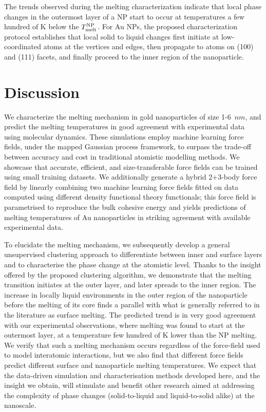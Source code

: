 \documentclass[%
aip,
 amsmath,amssymb,
 reprint,
]{revtex4-1}
\newcommand*\subt[1]{_{\textnormal{#1}}}
\newcommand*\supt[1]{^{\textnormal{#1}}}
\begin{document}
The trends observed during the melting characterization indicate that local phase changes in the outermost layer of a NP start to occur at temperatures a few hundred of K below the $T\subt{melt}\supt{NP}$.
%
For Au NPs, the proposed characterization protocol establishes that local solid to liquid changes first initiate at low-coordinated atoms at the vertices and edges, then propagate to atoms on (100) and (111) facets, and finally proceed to the inner region of the nanoparticle.
%

\section*{Discussion}
%
We characterize the melting mechanism in gold nanoparticles of size 1-6~$nm$, and predict the melting temperatures in good agreement with experimental data using molecular dynamics. 
%
These simulations employ machine learning force fields,  under the mapped Gaussian process framework, to surpass the trade-off between accuracy and cost in traditional atomistic modelling methods.
%
We showcase that accurate, efficient, and size-transferable force fields can be trained using small training datasets.
%
We additionally generate a hybrid 2+3-body force field by linearly combining two machine learning force fields fitted on data computed using different density functional theory functionals; this force field is parametrised to reproduce the bulk cohesive energy and yields predictions of melting temperatures of Au nanoparticles in striking agreement with available experimental data.

%
To elucidate the melting mechanism, we subsequently develop a general unsupervised clustering approach to differentiate between inner and surface layers and to characterise the phase change at the atomistic level.
%
Thanks to the insight offered by the proposed clustering algorithm, we demonstrate that the melting transition initiates at the outer layer, and later spreads to the inner region.
%
The increase in locally liquid environments in the outer region of the nanoparticle before the melting of its core finds a parallel with what is generally referred to in the literature as surface melting.
%
%
The predicted trend is in very good agreement with our experimental observations, where melting was found to start at the outermost layer, at a temperature few hundred of K lower than the NP melting.
%
We verify that such a melting mechanism occurs regardless of the force-field used to model interatomic interactions, but we also find that different force fields predict different surface and nanoparticle melting temperatures.
%
We expect that the data-driven simulation and characterisation methods developed here, and the insight we obtain, will stimulate and benefit other research aimed at addressing the complexity of phase changes (solid-to-liquid and liquid-to-solid alike) at the nanoscale.
%
\end{document}
